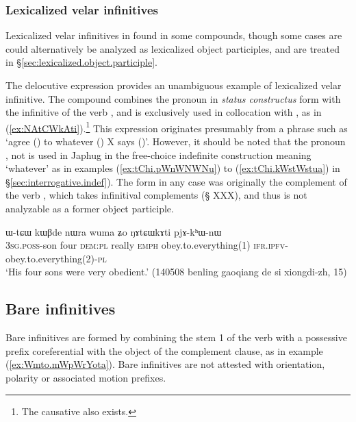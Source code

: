  
\subsubsection{Lexicalized velar infinitives}    \label{sec:lexicalized.velar.inf}
Lexicalized velar infinitives in  found in some compounds, though some cases are could alternatively be analyzed as lexicalized object participles, and are treated in §\ref{sec:lexicalized.object.participle}.

The delocutive expression  provides an unambiguous example of lexicalized velar infinitive. The compound  combines the pronoun  in \textit{status constructus} form  with the  infinitive  of the verb , and is exclusively used in collocation with , as in (\ref{ex:NAtCWkAti}).\footnote{The causative  also exists.} 
This expression originates presumably from a phrase such as `agree () to whatever () X says ()'. However, it should be noted that the pronoun , not  is used in Japhug in the free-choice indefinite construction meaning `whatever' as in examples (\ref{ex:tChi.pWnWNWNu}) to (\ref{ex:tChi.kWstWstua}) in §\ref{sec:interrogative.indef}). The form  in any case was originally the complement of the verb , which takes infinitival complements (§ XXX), and thus is not analyzable as a former object participle.

 \begin{exe}
\ex \label{ex:NAtCWkAti}
\gll  ɯ-tɕɯ kɯβde nɯra wuma ʑo ŋɤtɕɯkɤti pjɤ-kʰɯ-nɯ  \\
\textsc{3sg}.\textsc{poss}-son four \textsc{dem}:\textsc{pl} really \textsc{emph} obey.to.everything(1) \textsc{ifr.ipfv}-obey.to.everything(2)-\textsc{pl} \\
\glt `His four sons were very obedient.' (140508 benling gaoqiang de si xiongdi-zh, 15)
\end{exe} 

\subsection{Bare infinitives} \label{sec:bare.inf}
Bare infinitives are formed by combining the stem 1 of the verb with a possessive prefix coreferential with the object of the complement clause, as in example (\ref{ex:Wmto.mWpWrYota}). Bare infinitives are not attested with orientation, polarity or associated motion prefixes.

